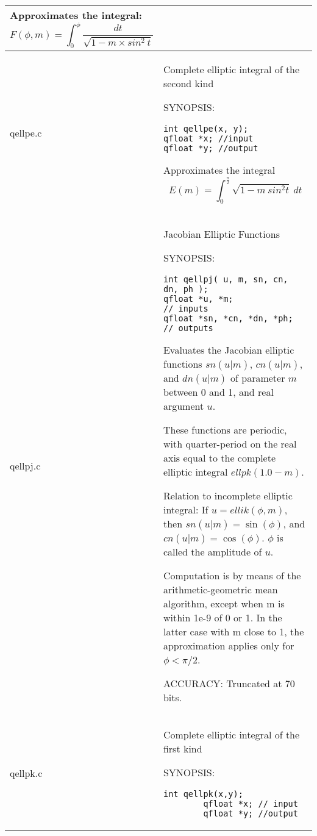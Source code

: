 \documentclass[10pt,a4paper,x11names]{memoir} %
\newcommand{\TOC}[1] {\addcontentsline{toc}{section}{#1} #1 \par}
\begin{document}
\begin{longtable}{|p{1.5cm}|p{11.5cm}|}
	 Approximates the integral:
	$$ F(\phi , m) = \int_{0}^{\phi} \frac{dt}{\sqrt{1-m\times sin^2 \ t}}$$
	\\\hline
	qellpe.c & \TOC{Complete elliptic integral of the second kind}
	{\footnotesize SYNOPSIS:}\vspace{-0.2cm}\index{qellpe}
	\begin{lstlisting}[numbers=none]
int qellpe(x, y);
qfloat *x; //input
qfloat *y; //output
	\end{lstlisting}\vspace{-0.2cm}
	Approximates the integral
	$$ E(m) = \int_{0}^{\frac{\pi}{2}} \sqrt{1 - m\ sin^2 t} \ dt$$
	\\\hline
	qellpj.c& \TOC{Jacobian Elliptic Functions}
	
	{\footnotesize SYNOPSIS:}\vspace{-0.2cm}\index{qellpi}
\begin{lstlisting}[numbers=none]
int qellpj( u, m, sn, cn, dn, ph );
qfloat *u, *m;             // inputs
qfloat *sn, *cn, *dn, *ph; // outputs
\end{lstlisting}\vspace{-0.2cm}
	
	
	Evaluates the Jacobian elliptic functions $sn(u|m)$, $cn(u|m)$,
	and $dn(u|m)$ of parameter $m$ between 0 and 1, and real
	argument $u$.
	
	These functions are periodic, with quarter-period on the
	real axis equal to the complete elliptic integral
	$ellpk(1.0-m)$.
	
	Relation to incomplete elliptic integral:
	If $u = ellik(\phi,m)$, then $sn(u|m) = \sin(\phi)$,
	and $cn(u|m) = \cos(\phi)$.  $\phi$ is called the amplitude of $u$.
	
	Computation is by means of the arithmetic-geometric mean
	algorithm, except when m is within 1e-9 of 0 or 1.  In the
	latter case with m close to 1, the approximation applies
	only for $\phi < \pi/2$.
	
	{\footnotesize{ACCURACY:}}  Truncated at 70 bits.
	\\\hline
	qellpk.c& \TOC{Complete elliptic integral of the first kind}
	
	{\footnotesize SYNOPSIS:}\vspace{-0.2cm}\index{qellpk}
	\begin{lstlisting}[numbers=none]
		int qellpk(x,y);
		qfloat *x; // input
		qfloat *y; //output
	\end{lstlisting}\vspace{-0.2cm}
	

\end{longtable}
\end{document}

